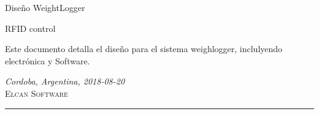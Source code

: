 \documentclass[a4paper,spanish]{article}
\author{%
	Mario O. Villarroel \\
	System Design/Developer\\
	\texttt{movilla@elcansoftware.com}\vspace{20pt} \\
	Pablo Giachero\\
	Product Owner\\
	\texttt{pgiachero@elcansoftware.com}
}
\def\documentdate{Cordoba, Argentina, 2018-08-20}
\begin{document}
	\begin{titlepage}
		\noindent
		\titlefont Dise\~no WeightLogger\par
		\vspace*{15pt}
		\subtitlefont RFID control\par
		\epigraph{Este documento detalla el dise\~no para el sistema weighlogger, inclulyendo electr\'onica y Software.}%
		{\textit{\documentdate}\\ \textsc{Elcan Software}}
		\null\vfill
		\vspace*{1cm}
		\noindent
		\hfill
		\begin{minipage}{0.50\linewidth}
		    \begin{flushright}
		        \printauthor
		    \end{flushright}
		\end{minipage}
		\begin{minipage}{0.02\linewidth}
		    \rule{1pt}{125pt}
		\end{minipage}
		\titlepagedecoration
	\end{titlepage}
	
	
\end{document}
